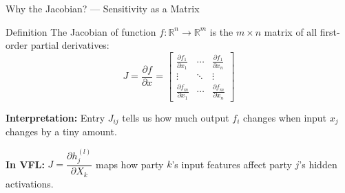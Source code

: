 \documentclass[aspectratio=169, 11pt]{beamer}
\begin{document}
\begin{frame}{Why the Jacobian? --- Sensitivity as a Matrix}
  \begin{block}{Definition}
    The Jacobian of function $f: \mathbb{R}^n \to \mathbb{R}^m$ is the $m \times n$ matrix of all first-order partial derivatives:
    \[
    J = \frac{\partial f}{\partial x} = \begin{bmatrix}
      \frac{\partial f_1}{\partial x_1} & \cdots & \frac{\partial f_1}{\partial x_n} \\
      \vdots & \ddots & \vdots \\
      \frac{\partial f_m}{\partial x_1} & \cdots & \frac{\partial f_m}{\partial x_n}
    \end{bmatrix}
    \]
  \end{block}
  \vspace{0.2cm}
  \textbf{Interpretation:} Entry $J_{ij}$ tells us how much output $f_i$ changes when input $x_j$ changes by a tiny amount.

  \vspace{0.2cm}
  \textbf{In VFL:} $J = \dfrac{\partial h_j^{(l)}}{\partial X_k}$ maps how party $k$'s input features affect party $j$'s hidden activations.
\end{frame}
\end{document}
